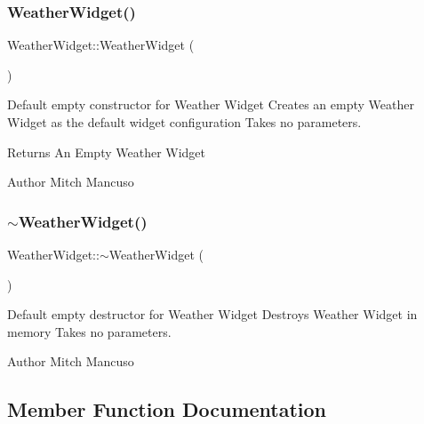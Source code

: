 \subsubsection{\texorpdfstring{Weather\+Widget()}{WeatherWidget()}}
{\footnotesize\ttfamily Weather\+Widget\+::\+Weather\+Widget (\begin{DoxyParamCaption}{ }\end{DoxyParamCaption})}



Default empty constructor for Weather Widget  Creates an empty Weather Widget as the default widget configuration  Takes no parameters. 

\begin{DoxyReturn}{Returns}
An Empty Weather Widget 
\end{DoxyReturn}
\begin{DoxyAuthor}{Author}
Mitch Mancuso 
\end{DoxyAuthor}
\mbox{\label{class_weather_widget_a1550f9b797beb612bc9346de32866735}} 
\subsubsection{\texorpdfstring{$\sim$\+Weather\+Widget()}{~WeatherWidget()}}
{\footnotesize\ttfamily Weather\+Widget\+::$\sim$\+Weather\+Widget (\begin{DoxyParamCaption}{ }\end{DoxyParamCaption})}



Default empty destructor for Weather Widget  Destroys Weather Widget in memory  Takes no parameters. 

\begin{DoxyAuthor}{Author}
Mitch Mancuso 
\end{DoxyAuthor}


\subsection{Member Function Documentation}
\mbox{\label{class_weather_widget_ad28175371be3fdbcdcbc221e0fd3d926}} 
